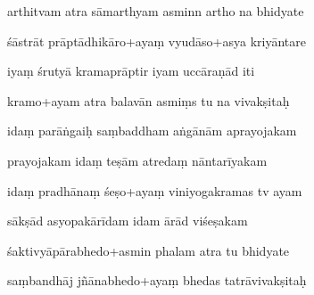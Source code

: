 \documentclass[article,12pt,a4paper]{memoir}%
\newcounter{parCount}
\begin{document}
	  
	  \pstart {} arthitvam atra sāmarthyam asminn artho na bhidyate 
	{}
	\pend%
      

	  
	  \pstart \leavevmode%
	śāstrāt prāptādhikāro+ayaṃ vyudāso+asya kriyāntare 
	{}
	\pend%
      

	  
	  \pstart {} iyaṃ śrutyā kramaprāptir iyam uccāraṇād iti 
	{}
	\pend%
      

	  
	  \pstart \leavevmode%
	kramo+ayam atra balavān asmiṃs tu na vivakṣitaḥ 
	{}
	\pend%
      

	  
	  \pstart {} idaṃ parāṅgaiḥ saṃbaddham aṅgānām aprayojakam 
	{}
	\pend%
      

	  
	  \pstart \leavevmode%
	prayojakam idaṃ teṣām atredaṃ nāntarīyakam 
	{}
	\pend%
      

	  
	  \pstart {} idaṃ pradhānaṃ śeṣo+ayaṃ viniyogakramas tv ayam 
	{}
	\pend%
      

	  
	  \pstart \leavevmode%
	sākṣād asyopakārīdam idam ārād viśeṣakam 
	{}
	\pend%
      

	  
	  \pstart {} śaktivyāpārabhedo+asmin phalam atra tu bhidyate 
	{}
	\pend%
      

	  
	  \pstart \leavevmode%
	saṃbandhāj jñānabhedo+ayaṃ bhedas tatrāvivakṣitaḥ 
	{}
	\pend%
      
\end{document}
